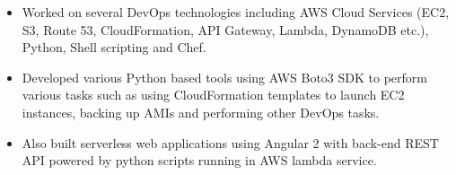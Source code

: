 \documentclass[10pt,a4paper,ragged2e]{maltacv}
\begin{document}
\divider

\begin{itemize}
  \item Worked on several DevOps technologies including AWS Cloud Services (EC2, S3, Route 53, CloudFormation, API Gateway, Lambda, DynamoDB etc.), Python, Shell scripting and Chef. 
  \item Developed various Python based tools using AWS Boto3 SDK to perform various tasks such as using CloudFormation templates to launch EC2 instances, backing up AMIs and performing other DevOps tasks. 
  \item Also built serverless web applications using Angular 2 with back-end REST API powered by python scripts running in AWS lambda service.
\end{itemize}

\divider
\medskip





\medskip
\medskip
\divider

\begin{multicols}{4} %
\end{multicols}

\end{document}
